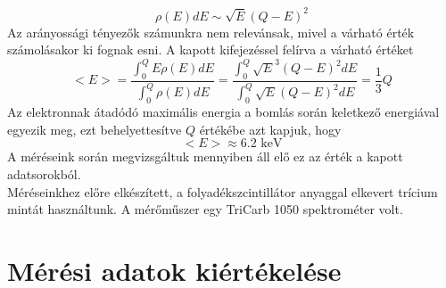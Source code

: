\documentclass[12pt,a4paper]{article}
\begin{document}
\begin{equation}
\rho (E) dE \sim \sqrt{E}(Q-E)^2
\end{equation}
Az arányossági tényezők számunkra nem relevánsak, mivel a várható érték számolásakor ki fognak esni. A kapott kifejezéssel felírva a várható értéket
\begin{equation}
<E>=\frac{\int^{Q}_0 E\rho (E) dE}{\int^{Q}_0 \rho (E) dE} = \frac{\int^{Q}_0 \sqrt{E}^3(Q-E)^2 dE}{\int^{Q}_0 \sqrt{E}(Q-E)^2 dE}=\frac{1}{3}Q
\end{equation}
Az elektronnak átadódó maximális energia a bomlás során keletkező energiával egyezik meg, ezt behelyettesítve $Q$ értékébe azt kapjuk, hogy
\begin{equation}
<E>\approx 6.2 \textrm{ keV}
\end{equation}
A méréseink során megvizsgáltuk mennyiben áll elő ez az érték a kapott adatsorokból.\\
\hspace*{10pt} Méréseinkhez előre elkészített, a folyadékszcintillátor anyaggal elkevert trícium mintát használtunk. A mérőműszer egy TriCarb 1050 spektrométer volt. 

\section{Mérési adatok kiértékelése}
\end{document}
